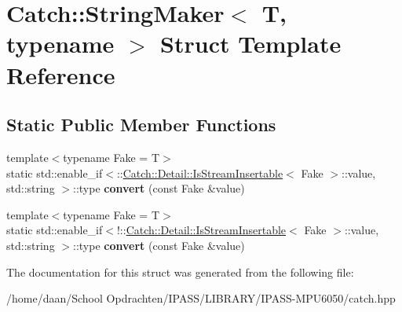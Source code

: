 \hypertarget{structCatch_1_1StringMaker}{}\section{Catch\+:\+:String\+Maker$<$ T, typename $>$ Struct Template Reference}
\label{structCatch_1_1StringMaker}
\subsection*{Static Public Member Functions}
\begin{DoxyCompactItemize}
\item 
\mbox{\label{structCatch_1_1StringMaker_ab2c357e22b754802c4b1351257103eb6}} 
{\footnotesize template$<$typename Fake  = T$>$ }\\static std\+::enable\+\_\+if$<$\+::\hyperlink{classCatch_1_1Detail_1_1IsStreamInsertable}{Catch\+::\+Detail\+::\+Is\+Stream\+Insertable}$<$ Fake $>$\+::value, std\+::string $>$\+::type {\bfseries convert} (const Fake \&value)
\item 
\mbox{\label{structCatch_1_1StringMaker_a68bb548de0e5ad364228b1ca3dd2f561}} 
{\footnotesize template$<$typename Fake  = T$>$ }\\static std\+::enable\+\_\+if$<$!\+::\hyperlink{classCatch_1_1Detail_1_1IsStreamInsertable}{Catch\+::\+Detail\+::\+Is\+Stream\+Insertable}$<$ Fake $>$\+::value, std\+::string $>$\+::type {\bfseries convert} (const Fake \&value)
\end{DoxyCompactItemize}


The documentation for this struct was generated from the following file\+:\begin{DoxyCompactItemize}
\item 
/home/daan/\+School Opdrachten/\+I\+P\+A\+S\+S/\+L\+I\+B\+R\+A\+R\+Y/\+I\+P\+A\+S\+S-\/\+M\+P\+U6050/catch.\+hpp\end{DoxyCompactItemize}
